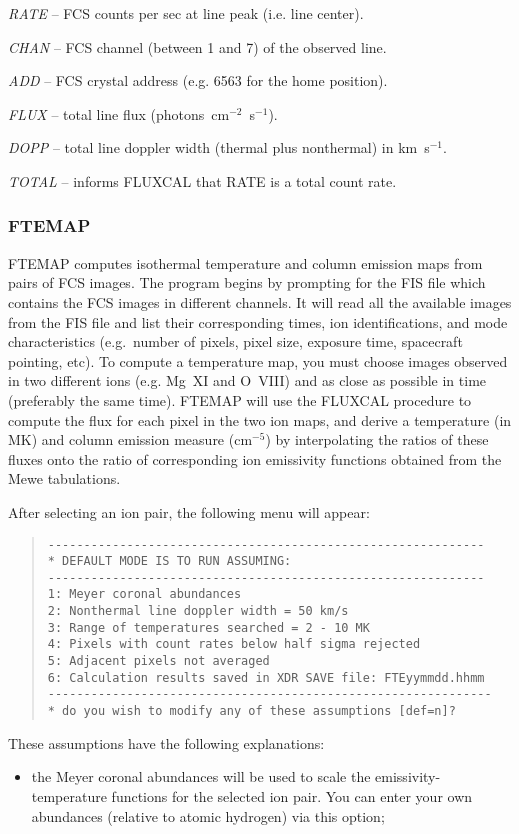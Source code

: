 {{{ {\it RATE} -- FCS counts per sec at line peak (i.e. line center).

 {\it CHAN} -- FCS channel (between 1 and 7) of the observed line.

 {\it ADD} -- FCS crystal address (e.g. 6563 for the home position).


{\it FLUX} -- total line flux (photons~cm$^{-2}$~s$^{-1}$).


{\it DOPP} --  total line doppler width (thermal plus nonthermal) in km~s$^{-1}$.

{\it TOTAL} -- informs FLUXCAL that RATE is a total count rate.

\subsubsection{FTEMAP}

FTEMAP computes isothermal temperature and  column emission maps from pairs
of FCS images. The program begins by  prompting for the FIS file which
contains the FCS images in different channels. It will read all the available
images from the FIS file and list their corresponding times, ion
identifications, and mode characteristics (e.g.\ number of pixels, pixel size,
exposure time, spacecraft pointing, etc). To compute a temperature map, you
must choose  images observed in two different ions (e.g. Mg~XI and O~VIII) and
as close as possible in time (preferably the same time). FTEMAP will use the
FLUXCAL procedure to compute the flux for each pixel in the two ion maps, and
derive a temperature (in MK) and column emission measure (cm$^{-5}$) by
interpolating the ratios of these fluxes onto the ratio of corresponding ion
emissivity functions obtained from the Mewe tabulations.

After selecting an ion pair, the following menu will appear:
\begin{quote}
\begin{verbatim}
-------------------------------------------------------------
* DEFAULT MODE IS TO RUN ASSUMING:
-------------------------------------------------------------
1: Meyer coronal abundances
2: Nonthermal line doppler width = 50 km/s
3: Range of temperatures searched = 2 - 10 MK
4: Pixels with count rates below half sigma rejected
5: Adjacent pixels not averaged
6: Calculation results saved in XDR SAVE file: FTEyymmdd.hhmm
--------------------------------------------------------------
* do you wish to modify any of these assumptions [def=n]?
\end{verbatim}
\end{quote}
These assumptions have the following explanations:
\begin{itemize}
\item the Meyer coronal abundances will be used to scale the
emissivity-temperature functions for the selected ion pair. You can enter your
own abundances (relative to atomic hydrogen) via this option;


\end{itemize}}}}

